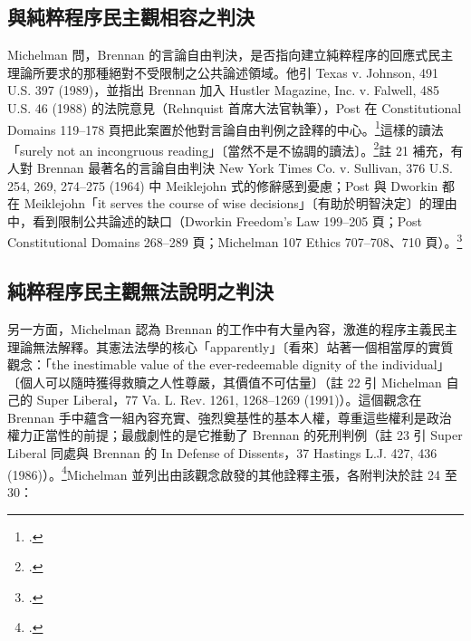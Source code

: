 \subsection{與純粹程序民主觀相容之判決}

Michelman 問，Brennan 的言論自由判決，是否指向建立純粹程序的回應式民主理論所要求的那種絕對不受限制之公共論述領域。他引 Texas v. Johnson, 491 U.S. 397 (1989)，並指出 Brennan 加入 Hustler Magazine, Inc. v. Falwell, 485 U.S. 46 (1988) 的法院意見（Rehnquist 首席大法官執筆），Post 在 Constitutional Domains 119--178 頁把此案置於他對言論自由判例之詮釋的中心。\footcite[406 n.20]{michelman1998}這樣的讀法「surely not an incongruous reading」〔當然不是不協調的讀法〕。\footcite[406]{michelman1998}註 21 補充，有人對 Brennan 最著名的言論自由判決 New York Times Co. v. Sullivan, 376 U.S. 254, 269, 274--275 (1964) 中 Meiklejohn 式的修辭感到憂慮；Post 與 Dworkin 都在 Meiklejohn「it serves the course of wise decisions」〔有助於明智決定〕的理由中，看到限制公共論述的缺口（Dworkin Freedom's Law 199--205 頁；Post Constitutional Domains 268--289 頁；Michelman 107 Ethics 707--708、710 頁）。\footcite[406 n.21]{michelman1998}

\subsection{純粹程序民主觀無法說明之判決}

另一方面，Michelman 認為 Brennan 的工作中有大量內容，激進的程序主義民主理論無法解釋。其憲法法學的核心「apparently」〔看來〕站著一個相當厚的實質觀念：「the inestimable value of the ever-redeemable dignity of the individual」〔個人可以隨時獲得救贖之人性尊嚴，其價值不可估量〕（註 22 引 Michelman 自己的 Super Liberal，77 Va. L. Rev. 1261, 1268--1269 (1991)）。這個觀念在 Brennan 手中蘊含一組內容充實、強烈奠基性的基本人權，尊重這些權利是政治權力正當性的前提；最戲劇性的是它推動了 Brennan 的死刑判例（註 23 引 Super Liberal 同處與 Brennan 的 In Defense of Dissents，37 Hastings L.J. 427, 436 (1986)）。\footcite[406 nn.22--23]{michelman1998}Michelman 並列出由該觀念啟發的其他詮釋主張，各附判決於註 24 至 30：

